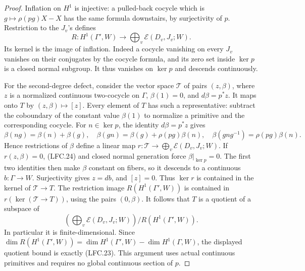 \documentclass[11pt,a4paper]{article}
\numberwithin{equation}{section}
\theoremstyle{remark}\newtheorem{remark}[theorem]{Remark}
\begin{document}
\begin{proof}
Inflation on \(H^1\) is injective: a pulled-back
cocycle which is \(g\mapsto\rho(p g)X-X\) has the
same formula downstairs, by surjectivity of \(p\).
Restriction to the \(J_v\)'s defines
\[
 R:H^1(\Gamma',W)\longrightarrow
                  \bigoplus_v\mathcal E(D_v,J_v;W).
 \]
Its kernel is the image of inflation.
Indeed a cocycle vanishing on every \(J_v\) vanishes
on their conjugates by the cocycle formula, and its zero
set inside \(\ker p\) is a closed normal subgroup.
It thus vanishes on \(\ker p\) and descends continuously.

For the second-degree defect, consider the vector space
\(\mathcal T\) of pairs \((z,\beta)\), where \(z\) is a
normalized continuous two-cocycle on \(\Gamma\),
\(\beta(1)=0\), and \(d\beta=p^*z\).
It maps onto \(T\) by \((z,\beta)\mapsto[z]\).
Every element of \(T\) has such a representative:
subtract the coboundary of the constant value \(\beta(1)\)
to normalize a primitive and the corresponding cocycle.
For \(n\in\ker p\), the identity \(d\beta=p^*z\) gives
\[
 \beta(ng)=\beta(n)+\beta(g),\quad
 \beta(gn)=\beta(g)+\rho(p g)\beta(n),\quad
 \beta(gng^{-1})=\rho(p g)\beta(n).                       \tag{LFC.24}
\]
Hence restrictions of \(\beta\) define a linear map
\(r:\mathcal T\to\bigoplus_v\mathcal E(D_v,J_v;W)\).
If \(r(z,\beta)=0\), (LFC.24) and closed normal generation
force \(\beta|_{\ker p}=0\).
The first two identities then make \(\beta\) constant
on fibers, so it descends to a continuous \(b:\Gamma\to W\).
Surjectivity gives \(z=db\), and \([z]=0\).
Thus \(\ker r\) is contained in the kernel of
\(\mathcal T\to T\).
The restriction image \(R(H^1(\Gamma',W))\) is contained
in \(r(\ker(\mathcal T\to T))\), using the pairs \((0,\beta)\).
It follows that \(T\) is a quotient of a subspace of
\[
 \left(\bigoplus_v\mathcal E(D_v,J_v;W)\right)
                    \big/R(H^1(\Gamma',W)).
 \]
In particular it is finite-dimensional.
Since
\(\dim R(H^1(\Gamma',W))=
 \dim H^1(\Gamma',W)-\dim H^1(\Gamma,W)\),
the displayed quotient bound is exactly (LFC.23).
This argument uses actual continuous primitives and
requires no global continuous section of \(p\).
\end{proof}

\end{document}

